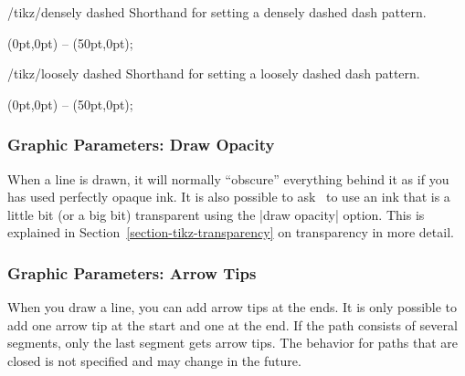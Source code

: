 \begin{stylekey}{/tikz/densely dashed}
  Shorthand for setting a densely dashed dash pattern.

\begin{codeexample}[]
\tikz {} (0pt,0pt) -- (50pt,0pt);
\end{codeexample}
\end{stylekey}

\begin{stylekey}{/tikz/loosely dashed}
  Shorthand for setting a loosely dashed dash pattern.

\begin{codeexample}[]
\tikz {} (0pt,0pt) -- (50pt,0pt);
\end{codeexample}
\end{stylekey}


\subsubsection{Graphic Parameters: Draw Opacity}

When a line is drawn, it will normally ``obscure'' everything behind
it as if you has used perfectly opaque ink. It is also possible to ask
\tikzname\ to use an ink that is a little bit (or a big bit)
transparent using the |draw opacity| option. This is explained in
Section~\ref{section-tikz-transparency} on transparency in more detail.



\subsubsection{Graphic Parameters: Arrow Tips}

When you draw a line, you can add arrow tips at the ends. It is
only possible to add one arrow tip at the start and one at the end. If
the path consists of several segments, only the last segment gets
arrow tips. The behavior for paths that are closed is not specified
and may change in the future.

